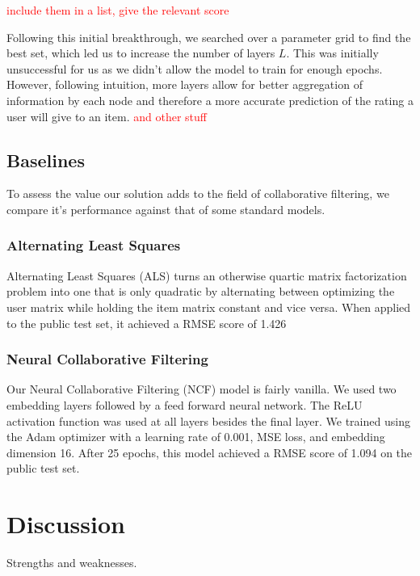 \documentclass[10pt,conference,compsocconf]{IEEEtran}
\begin{document}
\textcolor{red}{include them in a list, give the relevant score}

Following this initial breakthrough, we searched over a parameter grid to find the best set, which led us to increase the number of layers $L$. This was initially unsuccessful for us as we didn't allow the model to train for enough epochs. However, following intuition, more layers allow for better aggregation of information by each node and therefore a more accurate prediction of the rating a user will give to an item. \textcolor{red}{and other stuff}

\subsection{Baselines}

To assess the value our solution adds to the field of collaborative filtering, we compare it's performance against that of some standard models.

\subsubsection{Alternating Least Squares}

Alternating Least Squares (ALS) turns an otherwise quartic matrix factorization problem into one that is only quadratic by alternating between optimizing the user matrix while holding the item matrix constant and vice versa. When applied to the public test set, it achieved a RMSE score of 1.426

\subsubsection{Neural Collaborative Filtering}

Our Neural Collaborative Filtering (NCF) model is fairly vanilla. We used two embedding layers followed by a feed forward neural network. The ReLU activation function was used at all layers besides the final layer. We trained using the Adam optimizer with a learning rate of 0.001, MSE loss, and embedding dimension 16. After 25 epochs, this model achieved a RMSE score of 1.094 on the public test set.

\section{Discussion}
\label{sec:tips-software}

Strengths and weaknesses. 
\end{document}

